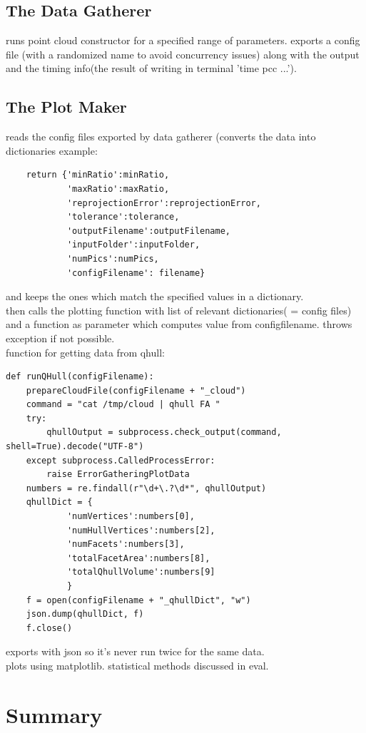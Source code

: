 \documentclass[12pt,a4paper,twoside,openright]{report}
\begin{document}
\subsection{The Data Gatherer}
runs point cloud constructor for a specified range of parameters. 
exports a config file (with a randomized name to avoid concurrency issues) along with the output and the timing info(the result of writing in terminal 'time pcc ...').
\subsection{The Plot Maker}
reads the config files exported by data gatherer (converts the data into dictionaries example: \begin{verbatim}
    return {'minRatio':minRatio,
            'maxRatio':maxRatio,
            'reprojectionError':reprojectionError,
            'tolerance':tolerance,
            'outputFilename':outputFilename,
            'inputFolder':inputFolder,
            'numPics':numPics,
            'configFilename': filename}
\end{verbatim} and keeps the ones which match the specified values in a dictionary.\\
then calls the plotting function with list of relevant dictionaries( = config files) and a function as parameter which computes value from configfilename. throws exception if not possible.\\
function for getting data from qhull: \begin{verbatim}
def runQHull(configFilename):
    prepareCloudFile(configFilename + "_cloud")
    command = "cat /tmp/cloud | qhull FA "
    try:
        qhullOutput = subprocess.check_output(command, shell=True).decode("UTF-8")
    except subprocess.CalledProcessError:
        raise ErrorGatheringPlotData
    numbers = re.findall(r"\d+\.?\d*", qhullOutput)
    qhullDict = {
            'numVertices':numbers[0],
            'numHullVertices':numbers[2],
            'numFacets':numbers[3],
            'totalFacetArea':numbers[8],
            'totalQhullVolume':numbers[9]
            }
    f = open(configFilename + "_qhullDict", "w")
    json.dump(qhullDict, f)
    f.close()

\end{verbatim} exports with json so it's never run twice for the same data.\\
plots using matplotlib. statistical methods discussed in eval.
\section{Summary} 
\end{document}
